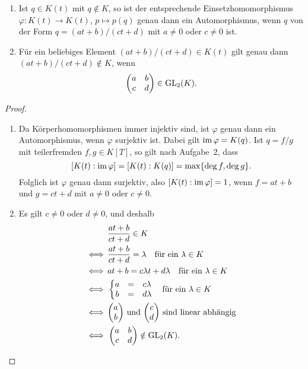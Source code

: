 \documentclass[a4paper,10pt,numbers=noenddot]{scrartcl}
\begin{document}
\begin{claim}
  \begin{enumerate}
    \item
      Ist $q \in K(t)$ mit $q \notin K$, so ist der entsprechende Einsetzhomomorphismus $\varphi \colon K(t) \to K(t)$, $p \mapsto p(q)$ genau dann ein Automorphismus, wenn $q$ von der Form $q = (at+b)/(ct+d)$ mit $a \neq 0$ oder $c \neq 0$ ist.
    \item
      Für ein beliebiges Element $(at+b)/(ct+d) \in K(t)$ gilt genau dann $(at+b)/(ct+d) \notin K$, wenn
      \[
        \begin{pmatrix}
          a & b
          \\
          c & d
        \end{pmatrix}
        \in \operatorname{GL}_2(K).
      \]
  \end{enumerate}
\end{claim}
\begin{proof}
  \begin{enumerate}
    \item
      Da Körperhomomorphismen immer injektiv sind, ist $\varphi$ genau dann ein Automorphismus, wenn $\varphi$ surjektiv ist.
      Dabei gilt $\operatorname{im} \varphi = K(q)$.
      Ist $q = f/g$ mit teilerfremden $f, g \in K[T]$, so gilt nach Aufgabe~2, dass
      \[
          [K(t) : \operatorname{im} \varphi]
        = [K(t) : K(q)]
        = \max\{ \deg f, \deg g \}.
      \]
      Folglich ist $\varphi$ genau dann surjektiv, also $[K(t) : \operatorname{im} \varphi] = 1$, wenn $f = at+b$ und $g = ct+d$ mit $a \neq 0$ oder $c \neq 0$.
    \item
      Es gilt $c \neq 0$ oder $d \neq 0$, und deshalb
      \begin{align*}
            &\, \frac{at+b}{ct+d} \in K
        \\
        \iff&\, \frac{at+b}{ct+d} = \lambda       \quad \text{für ein $\lambda \in K$}
        \\
        \iff&\, at + b = c \lambda t + d \lambda  \quad \text{für ein $\lambda \in K$}
        \\
        \iff&\, \left\{
                  \begin{matrix}
                    a &=& c \lambda
                    \\
                    b &=& d \lambda
                  \end{matrix}
                \right.                           \quad \text{für ein $\lambda \in K$}
        \\
        \iff&\, \text{$\begin{pmatrix} a \\ b \end{pmatrix}$ und $\begin{pmatrix} c \\ d \end{pmatrix}$ sind linear abhängig}
        \\
        \iff&\, \begin{pmatrix}
                  a & b
                  \\
                  c & d
                \end{pmatrix}
                \notin \operatorname{GL}_2(K).
      \end{align*}
  \end{enumerate}
\end{proof}
\end{document}

